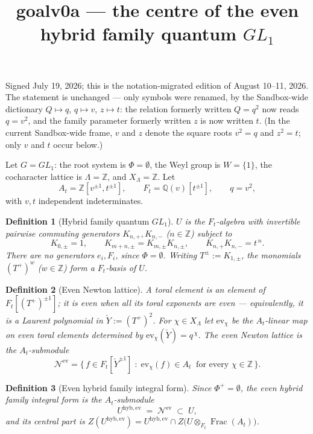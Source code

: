 \documentclass[11pt]{article}
\title{\textbf{goalv0a} --- the centre of the even hybrid family quantum $GL_1$}
\author{}
\date{}
\newtheorem{definition}{Definition}
\newcommand{\At}{A_t}
\newcommand{\Ft}{F_t}
\newcommand{\Nev}{\mathcal N^{\mathrm{ev}}}
\newcommand{\Uev}{U^{\mathrm{hyb,ev}}}
\newcommand{\Yc}{\check Y}
\begin{document}
\maketitle

\noindent
Signed July 19, 2026; this is the notation-migrated edition of August 10--11, 2026.
The statement is unchanged --- only symbols were renamed, by the Sandbox-wide dictionary
$Q\mapsto q$, $q\mapsto v$, $z\mapsto t$: the relation formerly written $Q=q^{2}$ now
reads $q=v^{2}$, and the family parameter formerly written $z$ is now written $t$.
(In the current Sandbox-wide frame, $v$ and $z$ denote the square roots $v^{2}=q$ and
$z^{2}=t$; only $v$ and $t$ occur below.)

\medskip

Let $G=GL_1$: the root system is $\Phi=\emptyset$, the Weyl group is
$W=\{1\}$, the cocharacter lattice is $\Lambda=\mathbb Z$, and
$X_\Lambda=\mathbb Z$. Let
\[
  \At=\mathbb Z[v^{\pm1},t^{\pm1}],\qquad
  \Ft=\mathbb Q(v)[t^{\pm1}],\qquad
  q=v^{2},
\]
with $v,t$ independent indeterminates.

\begin{definition}[Hybrid family quantum $GL_1$]\label{def:U}
$U$ is the $\Ft$-algebra with invertible pairwise commuting generators
$K_{n,+},K_{n,-}$ ($n\in\mathbb Z$) subject to
\[
  K_{0,\pm}=1,\qquad
  K_{m+n,\pm}=K_{m,\pm}K_{n,\pm},\qquad
  K_{n,+}K_{n,-}=t^{\,n}.
\]
There are no generators $e_i,F_i$, since $\Phi=\emptyset$. Writing
$T^{\pm}:=K_{1,\pm}$, the monomials $(T^{+})^{w}$ ($w\in\mathbb Z$) form a
$\Ft$-basis of $U$.
\end{definition}

\begin{definition}[Even Newton lattice]\label{def:nev}
A \emph{toral} element is an element of $\Ft[(T^{+})^{\pm1}]$; it is \emph{even}
when all its toral exponents are even --- equivalently, it is a Laurent
polynomial in $\Yc:=(T^{+})^{2}$. For $\chi\in X_\Lambda$ let
$\mathrm{ev}_\chi$ be the $\At$-linear map on even toral elements determined by
$\mathrm{ev}_\chi(\Yc)=q^{\,\chi}$. The \emph{even Newton lattice} is the
$\At$-submodule
\[
  \Nev=\bigl\{\,f\in\Ft[\Yc^{\pm1}]\;:\;
  \mathrm{ev}_\chi(f)\in\At\ \text{ for every }\chi\in\mathbb Z\,\bigr\}.
\]
\end{definition}

\begin{definition}[Even hybrid family integral form]\label{def:uev}
Since $\Phi^{+}=\emptyset$, the \emph{even hybrid family integral form} is the
$\At$-submodule
\[
  \Uev\;=\;\Nev\;\subset\;U,
\]
and its \emph{central part} is
$Z(\Uev)=\Uev\cap Z\bigl(U\otimes_{\Ft}\operatorname{Frac}(\At)\bigr)$.
\end{definition}
\end{document}
